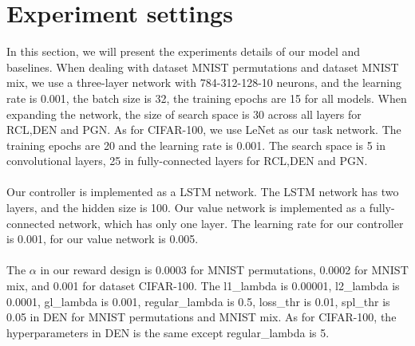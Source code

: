\documentclass{article}
\begin{document}



\appendix

\section{Experiment settings}
In this section, we will present the experiments details of our model and baselines. When dealing with dataset MNIST permutations and dataset MNIST mix, we use a three-layer network with 784-312-128-10 neurons, and the learning rate is 0.001, the batch size is 32, the training epochs are 15 for all models. When expanding the network, the size of search space is 30 across all layers for RCL,DEN and PGN. As for CIFAR-100, we use LeNet as our task network. The training epochs are 20 and the learning rate is 0.001. The search space is 5 in convolutional layers, 25 in fully-connected layers for RCL,DEN and PGN. \\
\\
Our controller is implemented as a LSTM network. The LSTM network has two layers, and the hidden size is 100. Our value network is implemented as a fully-connected network, which has only one layer. The learning rate for our controller is 0.001, for our value network is 0.005. \\
\\
The $\alpha$ in our reward design is 0.0003 for MNIST permutations, 0.0002 for MNIST mix, and 0.001 for dataset CIFAR-100. The l1\_lambda is 0.00001, l2\_lambda is 0.0001, gl\_lambda is 0.001, regular\_lambda is 0.5, loss\_thr is 0.01, spl\_thr is 0.05 in DEN for MNIST permutations and MNIST mix. As for CIFAR-100, the hyperparameters in DEN is the same except regular\_lambda is 5.
\end{document}
